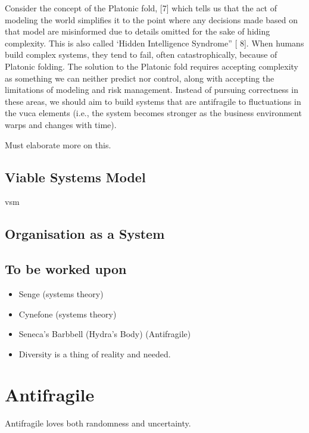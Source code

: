 Consider the concept of the Platonic fold, [7] which tells us that the act of modeling the world
simplifies it to the point where any decisions made based on that model are misinformed due to details omitted for
the sake of hiding complexity. This is also called ‘Hidden Intelligence Syndrome” [ 8]. When humans build complex systems, they tend to fail, often catastrophically, because of Platonic folding. The
solution to the Platonic fold requires accepting complexity as something we can neither predict nor control, along
with accepting the limitations of modeling and risk management. Instead of pursuing correctness in these areas, we
should aim to build systems that are \gls{antifragile} to fluctuations in the \acrshort{vuca} elements (i.e., the system becomes
stronger as the business environment warps and changes with time). \parencite[p. 885]{OReilly2019}

\begin{remark}
	Must elaborate more on this.
\end{remark}

\subsection{Viable Systems Model}
\label{sub:tbvsm}
\acrfull{vsm}


\subsection{Organisation as a System}
\label{sub:tborganisation}

\subsection{To be worked upon}

\begin{itemize}
	\item{Senge (systems theory)}
	\item{Cynefone (systems theory)}
	\item{Seneca's Barbbell (Hydra's Body) (Antifragile)}
	\item{Diversity is a thing of reality and needed.}
\end{itemize}

\section{Antifragile}
\label{sec:tbantifragile}

Antifragile loves both randomness and uncertainty.


